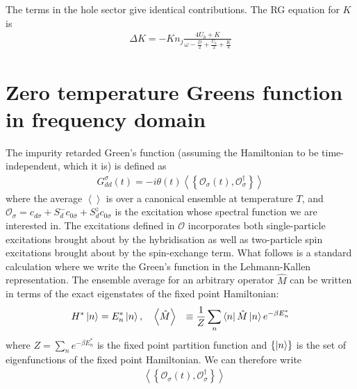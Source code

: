 \documentclass{report}
\numberwithin{equation}{section}
\begin{document}
\begin{appendices}
The terms in the hole sector give identical contributions. The RG equation for \(K\) is
\begin{equation}\begin{aligned}
	\Delta K = -K n_j\frac{4 U_b + K}{\omega - \frac{D}{2} + \frac{U_b}{2} + \frac{K}{4}}
\end{aligned}\end{equation}

\chapter{Zero temperature Greens function in frequency domain}

\label{appx-spectral-func}
The impurity retarded Green's function (assuming the Hamiltonian to be time-independent, which it is) is defined as
\begin{equation}\begin{aligned}
	G_{dd}^\sigma(t) = -i\theta(t) \left<\left\{ \mathcal{O}_{\sigma}(t),\mathcal{O}^\dagger_{\sigma} \right\}  \right>
\end{aligned}\end{equation}
where the average \(\left< \right>\) is over a canonical ensemble at temperature \(T\), and \(\mathcal{O}_\sigma = c_{d\sigma} + S_d^- c_{0\overline\sigma} + S_d^z c_{0\sigma}\) is the excitation whose spectral function we are interested in. The excitations defined in \(\mathcal{O}\) incorporates both single-particle excitations brought about by the hybridisation as well as two-particle spin excitations brought about by the spin-exchange term. What follows is a standard calculation where we write the Green's function in the Lehmann-Kallen representation. The ensemble average for an arbitrary operator \(\hat M\) can be written in terms of the exact eigenstates of the fixed point Hamiltonian:
\begin{equation}\begin{aligned}
	H^* \ket{n} &= E_n^* \ket{n}, ~ ~ ~\left<\hat M \right> &\equiv \frac{1}{Z}\sum_n \bra{n} \hat M \ket{n} e^{-\beta E_n^*}
\end{aligned}\end{equation}
where \(Z = \sum_n e^{-\beta E_n^*}\) is the fixed point partition function and \(\left\{ \ket{n} \right\} \) is the set of eigenfunctions of the fixed point Hamiltonian. We can therefore write
\begin{equation}\begin{aligned}
	&\left<\left\{ \mathcal{O}_{\sigma}(t),\mathcal{O}^\dagger_{\sigma} \right\}  \right> \\

\end{aligned}
\end{equation}
\end{appendices}
\end{document}
